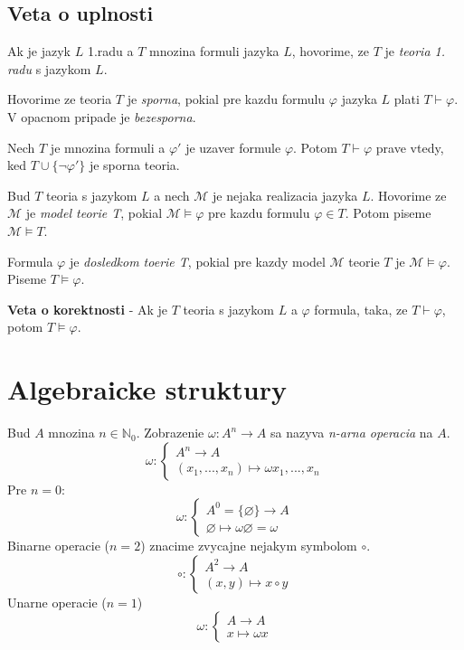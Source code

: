 \documentclass[12pt]{article}
\begin{document}
\subsection{Veta o uplnosti}
Ak je jazyk $L$ 1.radu a $T$ mnozina formuli jazyka $L$, hovorime, ze $T$ je
	\emph{teoria 1. radu} s jazykom $L$.

Hovorime ze teoria $T$ je \emph{sporna}, pokial pre kazdu formulu $\varphi$ jazyka $L$ plati
	$T \vdash \varphi$. V opacnom pripade je \emph{bezesporna}.

Nech $T$ je mnozina formuli a $\varphi'$ je uzaver formule $\varphi$. Potom $T \vdash \varphi$
prave vtedy, ked $T \cup \{\neg\varphi'\}$ je sporna teoria.

Bud $T$ teoria s jazykom $L$ a nech $\mathcal{M}$ je nejaka realizacia jazyka $L$.
Hovorime ze $\mathcal{M}$ je \emph{model teorie T}, pokial $\mathcal{M} \models \varphi$
pre kazdu formulu $\varphi \in T$. Potom piseme $\mathcal{M} \models T$.

Formula $\varphi$ je \emph{dosledkom toerie T}, pokial pre kazdy model $\mathcal{M}$
teorie $T$ je $\mathcal{M} \models \varphi$. Piseme $T \models \varphi$.

\textbf{Veta o korektnosti} - Ak je $T$ teoria s jazykom $L$ a $\varphi$ formula, taka, ze
$T \vdash \varphi$, potom $T \models \varphi$.

\section{Algebraicke struktury}

Bud $A$ mnozina $n \in \mathbb{N}_{0}$. Zobrazenie $\omega: A^{n} \to A$ sa nazyva
\emph{n-arna operacia} na $A$.
\begin{equation*}
	\omega :
	\begin{cases}
		A^{n} \to A \\
		(x_{1},...,x_{n}) \mapsto \omega x_{1},...,x_{n}
	\end{cases}
\end{equation*}
Pre $n = 0$:
\begin{equation*}
	\omega :
	\begin{cases}
		A^{0} = \{\varnothing\} \to A \\
		\varnothing \mapsto \omega \varnothing = \omega
	\end{cases}
\end{equation*}
Binarne operacie ($n = 2$) znacime zvycajne nejakym symbolom $\circ$.
\begin{equation*}
	\circ :
	\begin{cases}
		A^{2} \to A \\
		(x,y) \mapsto x \circ y
	\end{cases}
\end{equation*}
Unarne operacie ($n = 1$)
\begin{equation*}
	\omega :
	\begin{cases}
		A \to A \\
		x \mapsto \omega x
	\end{cases}
\end{equation*}
\end{document}
